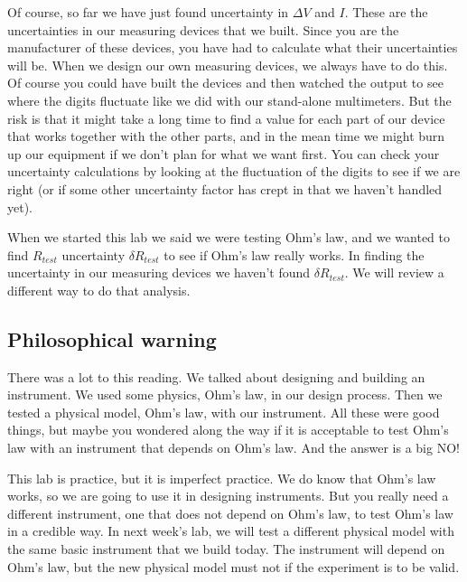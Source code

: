 Of course, so far we have just found uncertainty in $\Delta V$ and $I$.
These are the uncertainties in our measuring devices that we built. Since
you are the manufacturer of these devices, you have had to calculate what
their uncertainties will be. When we design our own measuring devices, we
always have to do this. Of course you could have built the devices and then
watched the output to see where the digits fluctuate like we did with our
stand-alone multimeters. But the risk is that it might take a long time to
find a value for each part of our device that works together with the other
parts, and in the mean time we might burn up our equipment if we don't plan
for what we want first. You can check your uncertainty calculations by
looking at the fluctuation of the digits to see if we are right (or if some
other uncertainty factor has crept in that we haven't handled yet).

When we started this lab we said we were testing Ohm's law, and we wanted to find $R_{test}$ uncertainty $\delta R_{test}$ to see if Ohm's law really
works. In finding the uncertainty in our measuring devices we haven't found $\delta R_{test}.$ We will review a different way to do that analysis.

%


\subsection{Philosophical warning}

There was a lot to this reading. We talked about designing and building an
instrument. We used some physics, Ohm's law, in our design process. Then we
tested a physical model, Ohm's law, with our instrument. All these were good things, but maybe you wondered along the way if it is acceptable to test Ohm's law with an instrument that depends on Ohm's law. And the answer is a big NO!

This lab is practice, but it is imperfect practice. We do know that Ohm's
law works, so we are going to use it in designing instruments. But you
really need a different instrument, one that does not depend on Ohm's law,
to test Ohm's law in a credible way. In next week's lab, we will test a
different physical model with the same basic instrument that we build today. The instrument will depend on Ohm's law, but the new physical model must not if the experiment is to be valid.

